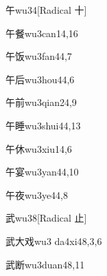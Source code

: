 \begin{verbete}{午}{wu3}{4}[Radical 十]
\end{verbete}

\begin{verbete}{午餐}{wu3can1}{4,16}
\end{verbete}

\begin{verbete}{午饭}{wu3fan4}{4,7}
\end{verbete}

\begin{verbete}{午后}{wu3hou4}{4,6}
\end{verbete}

\begin{verbete}{午前}{wu3qian2}{4,9}
\end{verbete}

\begin{verbete}{午睡}{wu3shui4}{4,13}
\end{verbete}

\begin{verbete}{午休}{wu3xiu1}{4,6}
\end{verbete}

\begin{verbete}{午宴}{wu3yan4}{4,10}
\end{verbete}

\begin{verbete}{午夜}{wu3ye4}{4,8}
\end{verbete}

\begin{verbete}{武}{wu3}{8}[Radical 止]
\end{verbete}

\begin{verbete}{武大戏}{wu3 da4xi4}{8,3,6}
\end{verbete}

\begin{verbete}{武断}{wu3duan4}{8,11}
\end{verbete}

